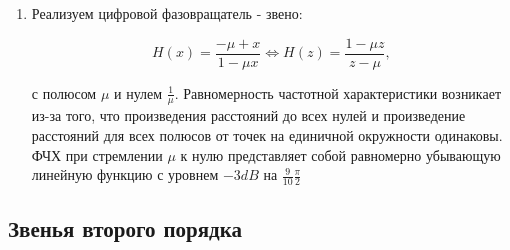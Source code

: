\documentclass[a4paper, 12pt]{article}%
\begin{document}
\begin{enumerate}
\newpage

\item Реализуем цифровой фазовращатель - звено:

\[H(x) = \frac{-\mu + x}{1 - \mu x} \Leftrightarrow H(z) = \frac{1 - \mu z}{z - \mu},\]

с полюсом $\mu$ и нулем $\frac{1}{\mu}$. Равномерность частотной характеристики возникает из-за того, что произведения расстояний до всех нулей и произведение расстояний для всех полюсов от точек на единичной окружности одинаковы. ФЧХ при стремлении $\mu$ к нулю представляет собой равномерно убывающую линейную функцию с уровнем $-3 dB$ на $\frac{9}{10} \frac{\pi}{2}$
\end{enumerate}

\subsection{Звенья второго порядка}
\end{document}
